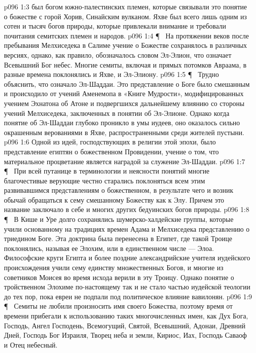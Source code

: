 \vs p096 1:3 \bibnobreakspace {} был богом южно\hyp{}палестинских племен, которые связывали это понятие о божестве с горой Хорив, Синайским вулканом. Яхве был всего лишь одним из сотен и тысяч богов природы, которые привлекали внимание и требовали почитания семитских племен и народов.
\vs p096 1:4 \P\ \bibnobreakspace {} На протяжении веков после пребывания Мелхиседека в Салиме  учение о Божестве сохранялось в различных версиях, однако, как правило, обозначалось словом Эл\hyp{}Элион, что означает Всевышний Бог небес. Многие семиты, включая и прямых потомков Авраама, в разные времена поклонялись и Яхве, и Эл\hyp{}Элиону.
\vs p096 1:5 \P\ \bibnobreakspace {} Трудно объяснить, что означало Эл\hyp{}Шаддаи. Это представление о Боге было смешанным и происходило от учений Аменемопа в «Книге Мудрости», модифицированных учением Эхнатона об Атоне и подвергшихся дальнейшему влиянию со стороны учений Мелхиседека, заключенных в понятии об Эл\hyp{}Элионе. Однако когда понятие об Эл\hyp{}Шаддаи глубоко проникло в умы иудеев, оно оказалось сильно окрашенным верованиями в Яхве, распространенными среди жителей пустыни.
\vs p096 1:6 Одной из идей, господствующих в религии этой эпохи, было представление египтян о божественном Провидении, учение о том, что материальное процветание является наградой за служение Эл\hyp{}Шаддаи.
\vs p096 1:7 \P\ \bibnobreakspace {} При всей путанице в терминологии и неясности понятий многие благочестивые верующие честно старались поклоняться всем этим развивавшимся представлениям о божественном, в результате чего и возник обычай обращаться к сему смешанному Божеству как к Элу. Причем это название заключало в себе и многих других бедуинских богов природы.
\vs p096 1:8 \P\ \bibnobreakspace {} В Кише и Уре долго сохранялись шумерско\hyp{}халдейские группы, которые учили основанному на традициях времен Адама и Мелхиседека представлению о триедином Боге. Эта доктрина была перенесена в Египет, где такой Троице поклонялись, называя ее Элохим, или в единственном числе --- Элоа. Философские круги Египта и более поздние александрийские учителя иудейского происхождения учили сему единству множественных Богов, и многие из советников Моисея во время исхода верили в эту Троицу. Однако понятие о тройственном Элохиме по\hyp{}настоящему так и не стало частью иудейской теологии до тех пор, пока евреи не подпали под политическое влияние вавилонян.
\vs p096 1:9 \P\ \bibnobreakspace {} Семиты не любили произносить имя своего Божества, поэтому время от времени прибегали к использованию таких многочисленных имен, как Дух Бога, Господь, Ангел Господень, Всемогущий, Святой, Всевышний, Адонаи, Древний Дней, Господь Бог Израиля, Творец неба и земли, Кириос, Иах, Господь Саваоф и Отец небесный.
